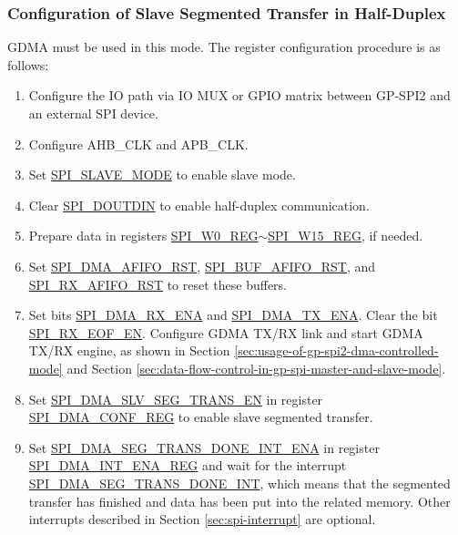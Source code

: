 \documentclass[main\_\_EN.tex]{subfiles}
\begin{document}
\subsubsection{Configuration of Slave Segmented Transfer in Half-Duplex}\label{sec:gp-spi2-slave-hd-seg-trans}

GDMA must be used in this mode. The register configuration procedure is as follows:

\begin{enumerate}
   \item Configure the IO path via IO MUX or GPIO matrix between GP-SPI2 and an external SPI device. 
   \item Configure AHB\_CLK and APB\_CLK.
    \item Set \hyperref[fielddesc:SPISLAVEMODE]{SPI\_SLAVE\_MODE} to enable slave mode.
    \item Clear \hyperref[fielddesc:SPIDOUTDIN]{SPI\_DOUTDIN} to enable half-duplex communication.
    \item Prepare data in registers \hyperref[regdesc:SPIW0REG]{SPI\_W0\_REG}$\sim$\hyperref[regdesc:SPIW15REG]{SPI\_W15\_REG}, if needed. 
    \item Set \hyperref[fielddesc:SPIDMAAFIFORST]{SPI\_DMA\_AFIFO\_RST}, \hyperref[fielddesc:SPIBUFAFIFORST]{SPI\_BUF\_AFIFO\_RST}, and \hyperref[fielddesc:SPIRXAFIFORST]{SPI\_RX\_AFIFO\_RST} to reset these buffers.
    \item Set bits \hyperref[fielddesc:SPIDMARXENA]{SPI\_DMA\_RX\_ENA} and \hyperref[fielddesc:SPIDMATXENA]{SPI\_DMA\_TX\_ENA}. Clear the bit \hyperref[fielddesc:SPIRXEOFEN]{SPI\_RX\_EOF\_EN}. Configure GDMA TX/RX link and start GDMA TX/RX engine, as shown in Section \ref{sec:usage-of-gp-spi2-dma-controlled-mode} and Section \ref{sec:data-flow-control-in-gp-spi-master-and-slave-mode}.
    \item Set \hyperref[fielddesc:SPIDMASLVSEGTRANSEN]{SPI\_DMA\_SLV\_SEG\_TRANS\_EN} in register \hyperref[regdesc:SPIDMACONFREG]{SPI\_DMA\_CONF\_REG} to enable slave segmented transfer.
    \item Set \hyperref[fielddesc:SPIDMASEGTRANSDONEINTENA]{SPI\_DMA\_SEG\_TRANS\_DONE\_INT\_ENA} in register \hyperref[regdesc:SPIDMAINTENAREG]{SPI\_DMA\_INT\_ENA\_REG} and wait for the interrupt \hyperref[int:SPIDMASEGTRANSDONEINT]{SPI\_DMA\_SEG\_TRANS\_DONE\_INT}, which means that the segmented transfer has finished and data has been put into the related memory. Other interrupts described in Section \ref{sec:spi-interrupt} are optional.
\end{enumerate}
\end{document}
